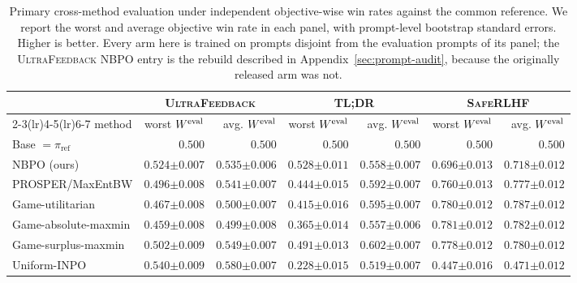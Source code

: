 \documentclass{article}
\theoremstyle{remark}
\theoremstyle{plain}
\newcommand{\piref}{\pi_{\mathrm{ref}}}
\newcommand{\NBPO}{\textsc{NBPO}}
\begin{document}
\begin{table}[t]
\centering\scriptsize
\setlength{\tabcolsep}{2.5pt}
\caption{Primary cross-method evaluation under independent objective-wise win rates against the common reference. We report the worst and average objective win rate in each panel, with prompt-level bootstrap standard errors. Higher is better. Every arm here is trained on prompts disjoint from the evaluation prompts of its panel; the \textsc{UltraFeedback} \NBPO{} entry is the rebuild described in Appendix~\ref{sec:prompt-audit}, because the originally released arm was not.}
\label{tab:multi-dataset-external}
\begin{tabular}{lrrrrrr}
\toprule
& \multicolumn{2}{c}{\textsc{UltraFeedback}} & \multicolumn{2}{c}{\textsc{TL;DR}} & \multicolumn{2}{c}{\textsc{SafeRLHF}}\\
\cmidrule(lr){2-3}\cmidrule(lr){4-5}\cmidrule(lr){6-7}
method & worst $W^{\rm eval}$ & avg. $W^{\rm eval}$ & worst $W^{\rm eval}$ & avg. $W^{\rm eval}$ & worst $W^{\rm eval}$ & avg. $W^{\rm eval}$\\
\midrule
Base $=\piref$ & $0.500$ & $0.500$ & $0.500$ & $0.500$ & $0.500$ & $0.500$\\
\NBPO{} (ours) & $0.524{\scriptstyle\pm0.007}$ & $0.535{\scriptstyle\pm0.006}$ & $0.528{\scriptstyle\pm0.011}$ & $0.558{\scriptstyle\pm0.007}$ & $0.696{\scriptstyle\pm0.013}$ & $0.718{\scriptstyle\pm0.012}$\\
PROSPER/MaxEntBW & $0.496{\scriptstyle\pm0.008}$ & $0.541{\scriptstyle\pm0.007}$ & $0.444{\scriptstyle\pm0.015}$ & $0.592{\scriptstyle\pm0.007}$ & $0.760{\scriptstyle\pm0.013}$ & $0.777{\scriptstyle\pm0.012}$\\
Game-utilitarian & $0.467{\scriptstyle\pm0.008}$ & $0.500{\scriptstyle\pm0.007}$ & $0.415{\scriptstyle\pm0.016}$ & $0.595{\scriptstyle\pm0.007}$ & $0.780{\scriptstyle\pm0.012}$ & $\mathbf{0.787{\scriptstyle\pm0.012}}$\\
Game-absolute-maxmin & $0.459{\scriptstyle\pm0.008}$ & $0.499{\scriptstyle\pm0.008}$ & $0.365{\scriptstyle\pm0.014}$ & $0.557{\scriptstyle\pm0.006}$ & $\mathbf{0.781{\scriptstyle\pm0.012}}$ & $0.782{\scriptstyle\pm0.012}$\\
Game-surplus-maxmin & $0.502{\scriptstyle\pm0.009}$ & $0.549{\scriptstyle\pm0.007}$ & $0.491{\scriptstyle\pm0.013}$ & $0.602{\scriptstyle\pm0.007}$ & $0.778{\scriptstyle\pm0.012}$ & $0.780{\scriptstyle\pm0.012}$\\
Uniform-INPO & $0.540{\scriptstyle\pm0.009}$ & $\mathbf{0.580{\scriptstyle\pm0.007}}$ & $0.228{\scriptstyle\pm0.015}$ & $0.519{\scriptstyle\pm0.007}$ & $0.447{\scriptstyle\pm0.016}$ & $0.471{\scriptstyle\pm0.012}$\\

\end{tabular}
\end{table}
\end{document}

